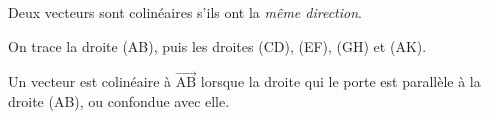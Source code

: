 \documentclass[border=4pt]{standalone}
\newcommand{\V}[1]{\overrightarrow{\mathrm{#1}}}
\begin{document}
\begin{minipage}{8.5cm}\large \colorbox{orange!8}{\begin{minipage}{8.2cm}\par Deux vecteurs sont colinéaires s'ils ont la \textit{même direction}.\par On trace la droite (AB), puis les droites (CD), (EF), (GH) et (AK).\par Un vecteur est colinéaire à $\V{AB}$ lorsque la droite qui le porte est parallèle à la droite (AB), ou confondue avec elle.\vspace{4pt}\end{minipage}}\end{minipage}
\end{document}

